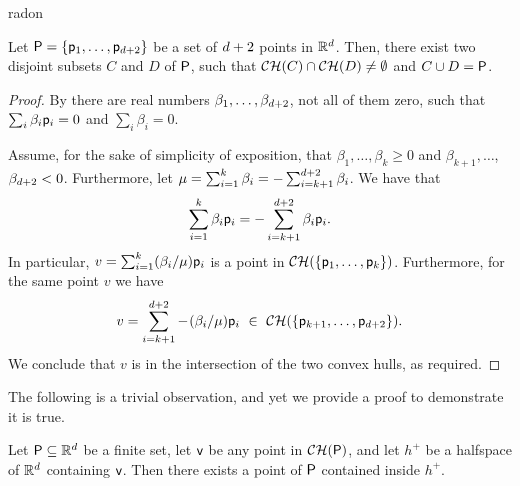 \begin{fragment}{radon}
\begin{theorem}
    Let ${\mathsf{P}} = \left\{ {\mathsf{p}_1, \ldots, \mathsf{p}_{d+2}} \right\}$ be a set of
    $d+2$ points in $\mathbb{R}^d$. Then, there exist two disjoint
    subsets $C$ and $D$ of ${\mathsf{P}}$, such that $\CHX{C} \cap \CHX{D}
    \ne \emptyset$ and $C \cup D = {\mathsf{P}}$. %
\end{theorem}
\end{fragment}
\begin{proof}
    By  there are real numbers $\beta_1, \ldots,
    \beta_{d+2}$, not all of them zero, such that $\sum_i \beta_i
    \mathsf{p}_i = 0$ and $\sum_i \beta_i = 0$.
    
    Assume, for the sake of simplicity of exposition, that $\beta_1, 
    \ldots, \beta_k \geq 0$ and $\beta_{k+1}, \ldots$,
    $\beta_{d+2} < 0$.  Furthermore, let $\mu = \sum_{i=1}^{k}
    \beta_i = -\sum_{i=k+1}^{d+2} \beta_i$.  We have that
    \begin{equation*}
        \sum_{i=1}^{k} \beta_i \mathsf{p}_i = - \sum_{i=k+1}^{d+2} \beta_i
        \mathsf{p}_i.        
    \end{equation*}
    In particular, $v = \sum_{i=1}^{k} (\beta_i/\mu) \mathsf{p}_i$ is a
    point in $\CHX{\brc{\pnt_1,\ldots, \pnt_k}}$. Furthermore, for the
    same point $v$ we have    
    \begin{equation*}
        v = \sum_{i=k+1}^{\hdim+2} - \ts(\beta_i/\mu) \pnt_i
        \,\,\in\,\,%
        \CHX{\brc{\pnt_{k+1}, \ldots, \pnt_{\hdim+2}}}.
    \end{equation*}
     We conclude that
    $v$ is in the intersection of the two convex hulls, as required.
\end{proof}


The following is a trivial observation, and yet we provide a proof to
demonstrate it is true.

\begin{lemma}
    Let ${\mathsf{P}} \subseteq \mathbb{R}^d$ be a finite set, let $\mathsf{v}$ be
    any point in $\CHX{\PntSet}$, and let $h^+$ be a halfspace of
    $\mathbb{R}^d$ containing $\mathsf{v}$. Then there exists a point of
    ${\mathsf{P}}$ contained inside $h^+$.
\end{lemma}

